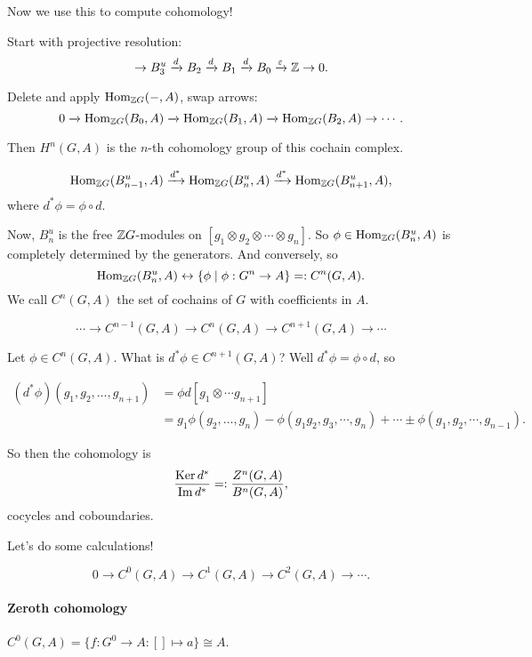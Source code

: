 Now we use this to compute cohomology!

Start with projective resolution:
\[
    \to  B^u_3 
    \xrightarrow{d}  B_2
    \xrightarrow{d}  B_1
    \xrightarrow{d}  B_0
    \xrightarrow{\varepsilon} \mathbb{Z}
    \to  0
.\] 

Delete and apply $\operatorname{Hom}_{\mathbb{Z} G}(-, A)$, swap arrows:
\[
    0
    \xrightarrow{ }  \operatorname{Hom}_{\mathbb{Z} G}( B_0,A)
    \xrightarrow{ }  \operatorname{Hom}_{\mathbb{Z} G}( B_1,A)
    \xrightarrow{ }  \operatorname{Hom}_{\mathbb{Z} G}( B_2,A)
    \to  \cdots
.\] 

Then $H^{n}(G, A)$ is the $n$-th cohomology group of this cochain complex.


\[
\operatorname{Hom}_{\mathbb{Z} G}(B_{n-1}^{u}, A) \xrightarrow{d^{*}} 
\operatorname{Hom}_{\mathbb{Z} G}(B_{n}^{u}, A) \xrightarrow{d^{*}} 
\operatorname{Hom}_{\mathbb{Z} G}(B_{n+1}^{u}, A) 
,\] 
where $d^{*} \phi = \phi  \circ  d$.

Now, $B_n^{u}$ is the free $\mathbb{Z} G$-modules on $[g_1 \otimes g_2 \otimes \cdots \otimes g_n]$.
So $\phi \in \operatorname{Hom}_{\mathbb{Z} G}(B_n^{u}, A)$ is completely determined by the generators.
And conversely, so
\[
    \operatorname{Hom}_{\mathbb{Z} G}(B_n^{u}, A) \leftrightarrow \{\phi  \mid \phi: G^{n} \to  A\} =: C^{n}(G, A)
.\] 
We call $C^{n}(G, A)$ the set of cochains of $G$ with coefficients in $A$.

\[
    \cdots \to  C^{n-1}(G, A) \to  
    C^{n}(G, A) \to  
    C^{n+1}(G, A) \to  \cdots
\] 

Let $\phi \in C^{n}(G, A)$. What is $d^{*}\phi \in C^{n+1}(G, A)$?
Well $d^{*}\phi = \phi  \circ  d$, so

\begin{align*}
    (d^{*} \phi)(g_1, g_2, \ldots, g_{n+1}) &= \phi d[g_1 \otimes \cdots g_{n+1}]\\
                                            &= 
                                            g_1 \phi(g_2, \ldots , g_n) 
                                            - \phi(g_1 g_2, g_3, \cdots, g_n)
                                            + \cdots \pm \phi(g_1, g_2, \cdots, g_{n-1})
.\end{align*} 

So then the cohomology is
\[
    \frac{\operatorname{Ker} d^{*}}{\operatorname{Im} d^{*}} =: \frac{Z^{n}(G, A)}{B^{n}(G, A)}
,\] 
cocycles and coboundaries.


Let's do some calculations!

\[
    0 \to  C^{0}(G, A) \to  C^{1}(G, A) \to  C^{2}(G, A) \to  \cdots 
.\] 

\paragraph{Zeroth cohomology}
\begin{remark}
    $C^{0}(G, A) = \{f: G^{0} \to  A: [] \mapsto a\}  \cong A$.
\end{remark}

